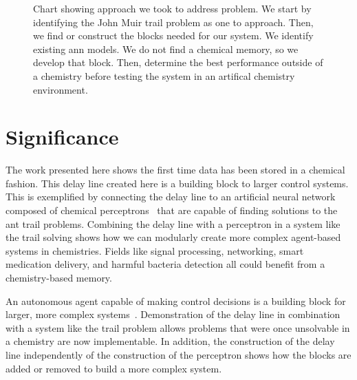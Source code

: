 \begin{figure}
\centering
{}

\caption[Approach Process]{Chart showing approach we took to address problem. We start by identifying the John Muir trail problem as one to approach. Then, we find or construct the blocks needed for our system. We identify existing \gls{ann} models. We do not find a chemical memory, so we develop that block. Then, determine the best performance outside of a chemistry before testing the system in an artifical chemistry environment. }
\label{fig:approach_process}
\end{figure}

\section{Significance}
The work presented here shows the first time data has been stored in a chemical fashion. This delay line created here is a building block to larger control systems. This is exemplified by connecting the delay line to an artificial neural network composed of chemical perceptrons~\cite{Banda2013-zs} that are capable of finding solutions to the ant trail problems. Combining the delay line with a perceptron in a system like the trail solving shows how we can modularly create more complex agent-based systems in chemistries. Fields like signal processing, networking, smart medication delivery, and harmful bacteria detection all could benefit from a chemistry-based memory. 

An autonomous agent capable of making control decisions is a building block for larger, more complex systems~\cite{Scheidt2002-bb}. Demonstration of the delay line in combination with a system like the trail problem allows problems that were once unsolvable in a chemistry are now implementable. In addition, the construction of the delay line independently of the construction of the perceptron shows how the blocks are added or removed to build a more complex system.


